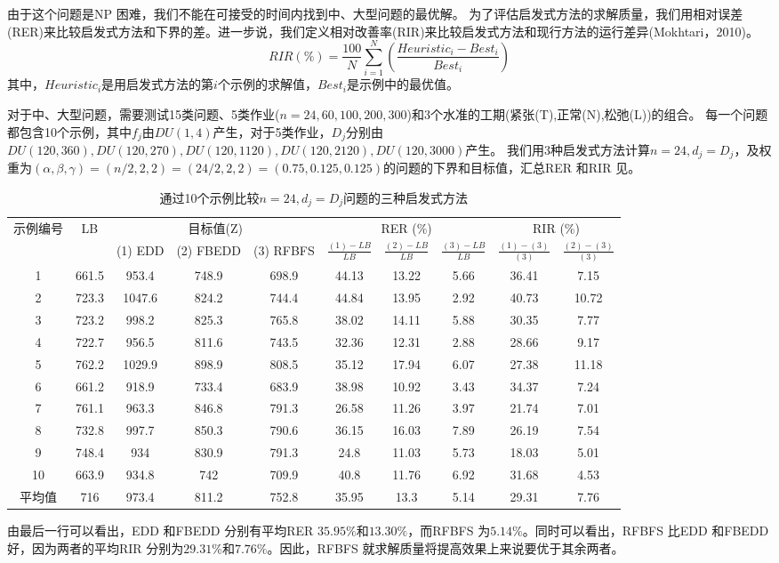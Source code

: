 由于这个问题是NP 困难，我们不能在可接受的时间内找到中、大型问题的最优解。
为了评估启发式方法的求解质量，我们用相对误差(RER)来比较启发式方法和下界的差。进一步说，我们定义相对改善率(RIR)来比较启发式方法和现行方法的运行差异(Mokhtari，2010)。
\[RIR(\%) = \frac{100}{N}\sum_{i=1}^N \left(\frac{Heuristic_i - Best_i}{Best_i}\right)
\]
其中，$Heuristic_i$是用启发式方法的第$i$个示例的求解值，$Best_i$是示例中的最优值。

对于中、大型问题，需要测试15类问题、5类作业($n = 24,60,100,200,300$)和3个水准的工期(紧张(T),正常(N),松弛(L))的组合。
每一个问题都包含10个示例，其中$f_j$由$DU(1,4)$产生，对于5类作业，$D_j$分别由$DU(120,360),DU(120,270),DU(120,1120),DU(120,2120),DU(120,3000)$产生。
我们用3种启发式方法计算$n=24,d_j=D_j$，及权重为$(\alpha,\beta,\gamma)=(n/2,2,2)=(24/2,2,2)=(0.75,0.125,0.125)$的问题的下界和目标值，汇总RER 和RIR 见。
\begin{table}[h]
  \centering\xiaowu
  \caption{通过10个示例比较$n=24, d_j = D_j$问题的三种启发式方法}
    \begin{tabular}{cccccccccc}
    \toprule
    \multirow{2}[4]{*}{示例编号} & \multirow{2}[4]{*}{LB}   & \multicolumn{3}{c}{目标值(Z)} & \multicolumn{3}{c}{RER (\%)} & \multicolumn{2}{c}{RIR (\%)} \\
    \cline{3-10}
          &       & (1) EDD & (2) FBEDD & (3) RFBFS &$\frac{(1) - LB}{LB}$ & $\frac{(2) - LB}{LB}$ & $\frac{(3) - LB}{LB}$ &$\frac{(1) - (3)}{(3)}$ & $\frac{(2) - (3)}{(3)}$ \\
          \midrule 
    1     & 661.5 & 953.4 & 748.9 & 698.9 & 44.13 & 13.22 & 5.66  & 36.41 & 7.15 \\
    2     & 723.3 & 1047.6 & 824.2 & 744.4 & 44.84 & 13.95 & 2.92  & 40.73 & 10.72 \\
    3     & 723.2 & 998.2 & 825.3 & 765.8 & 38.02 & 14.11 & 5.88  & 30.35 & 7.77 \\
    4     & 722.7 & 956.5 & 811.6 & 743.5 & 32.36 & 12.31 & 2.88  & 28.66 & 9.17 \\
    5     & 762.2 & 1029.9 & 898.9 & 808.5 & 35.12 & 17.94 & 6.07  & 27.38 & 11.18 \\
    6     & 661.2 & 918.9 & 733.4 & 683.9 & 38.98 & 10.92 & 3.43  & 34.37 & 7.24 \\
    7     & 761.1 & 963.3 & 846.8 & 791.3 & 26.58 & 11.26 & 3.97  & 21.74 & 7.01 \\
    8     & 732.8 & 997.7 & 850.3 & 790.6 & 36.15 & 16.03 & 7.89  & 26.19 & 7.54 \\
    9     & 748.4 & 934   & 830.9 & 791.3 & 24.8  & 11.03 & 5.73  & 18.03 & 5.01 \\
    10    & 663.9 & 934.8 & 742   & 709.9 & 40.8  & 11.76 & 6.92  & 31.68 & 4.53 \\[3pt]
    平均值   & 716   & 973.4 & 811.2 & 752.8 & 35.95 & 13.3  & 5.14  & 29.31 & 7.76 \\
    \bottomrule
    \end{tabular}
  \label{tab:comparen=24}
\end{table}
由最后一行可以看出，EDD 和FBEDD 分别有平均RER $35.95\%\text{和}13.30\%$，而RFBFS 为$5.14\%$。同时可以看出，RFBFS 比EDD 和FBEDD 好，因为两者的平均RIR 分别为$29.31\%\text{和}7.76\%$。因此，RFBFS 就求解质量将提高效果上来说要优于其余两者。

